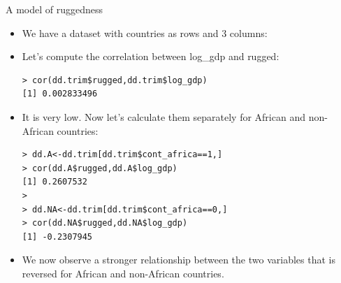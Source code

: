 \documentclass[handout]{beamer}
\begin{document}
\begin{frame}[fragile]{A model of ruggedness}
\scriptsize{

\begin{itemize}
\item We have a dataset with countries as rows and 3 columns: 



\item Let's compute the correlation between log\_gdp and rugged:

\begin{verbatim}
> cor(dd.trim$rugged,dd.trim$log_gdp)
[1] 0.002833496 
\end{verbatim}

\item It is very low. Now let's calculate them separately for African and non-African countries:

\begin{verbatim}
> dd.A<-dd.trim[dd.trim$cont_africa==1,]
> cor(dd.A$rugged,dd.A$log_gdp)
[1] 0.2607532
> 
> dd.NA<-dd.trim[dd.trim$cont_africa==0,]
> cor(dd.NA$rugged,dd.NA$log_gdp)
[1] -0.2307945 
\end{verbatim}

\item We now observe a stronger relationship between the two variables that is reversed for African and non-African countries.

\end{itemize}




} 
\end{frame}
\end{document}
